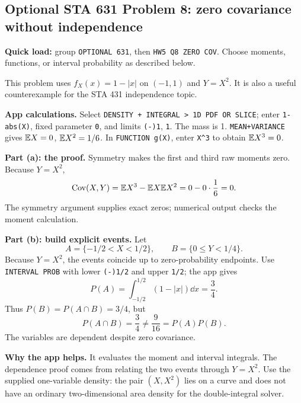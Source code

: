 \subsection{Optional STA 631 Problem 8: zero covariance without independence}
\textbf{Quick load:} group \texttt{OPTIONAL 631}, then \texttt{HW5 Q8 ZERO COV}. Choose moments, functions, or interval probability as described below.

This problem uses $f_X(x)=1-|x|$ on $(-1,1)$ and $Y=X^2$. It is also a useful counterexample for the STA 431 independence topic.

\textbf{App calculations.} Select \texttt{DENSITY + INTEGRAL > 1D PDF OR SLICE}; enter \texttt{1-abs(X)}, fixed parameter \texttt{0}, and limits \texttt{(-)1}, \texttt{1}. The mass is 1. \texttt{MEAN+VARIANCE} gives $\mathbb E X=0$, $\mathbb E X^2=1/6$. In \texttt{FUNCTION g(X)}, enter \texttt{X\^{}3} to obtain $\mathbb E X^3=0$.

\textbf{Part (a): the proof.} Symmetry makes the first and third raw moments zero. Because $Y=X^2$,
\[
\operatorname{Cov}(X,Y)=\mathbb E X^3-\mathbb E X\mathbb E X^2=0-0\cdot\frac16=0.
\]
The symmetry argument supplies exact zeros; numerical output checks the moment calculation.

\textbf{Part (b): build explicit events.} Let
\[
A=\{-1/2<X<1/2\},\qquad B=\{0\le Y<1/4\}.
\]
Because $Y=X^2$, the events coincide up to zero-probability endpoints. Use \texttt{INTERVAL PROB} with lower \texttt{(-)1/2} and upper \texttt{1/2}; the app gives
\[
P(A)=\int_{-1/2}^{1/2}(1-|x|)\dd x=\frac34.
\]
Thus $P(B)=P(A\cap B)=3/4$, but
\[
\boxed{P(A\cap B)=\frac34\ne\frac9{16}=P(A)P(B).}
\]
The variables are dependent despite zero covariance.

\textbf{Why the app helps.} It evaluates the moment and interval integrals. The dependence proof comes from relating the two events through $Y=X^2$. Use the supplied one-variable density: the pair $(X,X^2)$ lies on a curve and does not have an ordinary two-dimensional area density for the double-integral solver.
